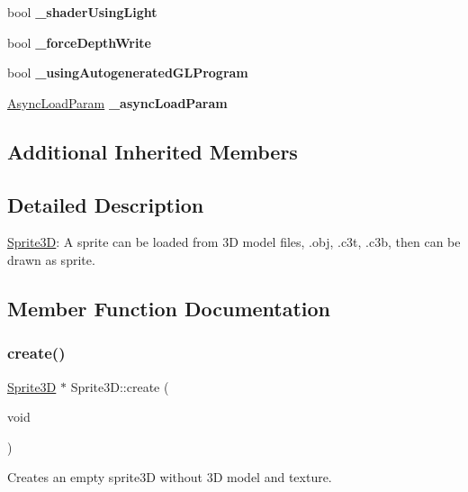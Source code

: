 \begin{DoxyCompactItemize}
bool {\bfseries \+\_\+shader\+Using\+Light}
\item 
\mbox{\label{classSprite3D_aac4616113701eeb8f70d10c5283ef9ec}} 
bool {\bfseries \+\_\+force\+Depth\+Write}
\item 
\mbox{\label{classSprite3D_a10af1a3ecfdf922a34bed0cdf4c768fc}} 
bool {\bfseries \+\_\+using\+Autogenerated\+G\+L\+Program}
\item 
\mbox{\label{classSprite3D_a28d81382f771ebe7f583eb7e78934661}} 
\hyperlink{structSprite3D_1_1AsyncLoadParam}{Async\+Load\+Param} {\bfseries \+\_\+async\+Load\+Param}
\end{DoxyCompactItemize}
\subsection*{Additional Inherited Members}


\subsection{Detailed Description}
\hyperlink{classSprite3D}{Sprite3D}\+: A sprite can be loaded from 3D model files, .obj, .c3t, .c3b, then can be drawn as sprite. 

\subsection{Member Function Documentation}
\mbox{\label{classSprite3D_a10905e0480bfcf875882a9ad7b538d78}} 
\subsubsection{\texorpdfstring{create()}{create()}\hspace{0.1cm}{\footnotesize\ttfamily [1/4]}}
{\footnotesize\ttfamily \hyperlink{classSprite3D}{Sprite3D} $\ast$ Sprite3\+D\+::create (\begin{DoxyParamCaption}\item[{void}]{ }\end{DoxyParamCaption})\hspace{0.3cm}{\ttfamily [static]}}

Creates an empty sprite3D without 3D model and texture.

